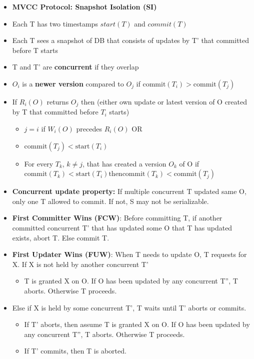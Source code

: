 \documentclass[8pt, landscape]{extarticle}
\begin{document}
\begin{multicols*}{4}
  \begin{itemize}
    \item \textbf{MVCC Protocol: Snapshot Isolation (SI)}
    \item Each T has two timestamps $start(T)$ and $commit(T)$
    \item Each T sees a snapshot of DB that consists of updates by T' that committed before T starts
    \item T and T' are \textbf{concurrent} if they overlap
    \item $O_i$ is a \textbf{newer version} compared to $O_j$ if $\text{commit}(T_i) > \text{commit}(T_j)$
    \item If $R_i(O)$ returns $O_j$ then (either own update or latest version of O created by T that committed before $T_i$ starts)
    \begin{itemize}
      \item $j = i$ if $W_i(O)$ precedes $R_i(O)$ OR
      \item $\text{commit}(T_j) < \text{start}(T_i)$
      \item For every $T_k$, $k \neq j$, that has created a version $O_k$ of O if $\text{commit}(T_k) < \text{start}(T_i) \text{then} \text{commit}(T_k) < \text{commit}(T_j)$ 
    \end{itemize}
    \item \textbf{Concurrent update property:} If multiple concurrent T updated same O, only one T allowed to commit. If not, S may not be serializable.
    \item \textbf{First Committer Wins (FCW)}: Before committing T, if another committed concurrent T' that has updated some O that T has updated exists, abort T. Else commit T.
    \item \textbf{First Updater Wins (FUW)}: When T needs to update O, T requests for X. If X is not held by another concurrent T'
    \begin{itemize}
      \item T is granted X on O. If O has been updated by any concurrent T'', T aborts. Otherwise T proceeds.
    \end{itemize}
    \item Else if X is held by some concurrent T', T waits until T' aborts or commits.
    \begin{itemize}
      \item If T' aborts, then assume T is granted X on O. If O has been updated by any concurrent T'', T aborts. Otherwise T proceeds.
      \item If T' commits, then T is aborted.

\end{itemize}
\end{itemize}
\end{multicols*}
\end{document}
